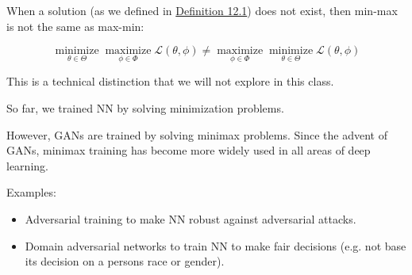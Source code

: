 \documentclass{report}
\begin{document}
\begin{concept}
    When a solution (as we defined in \hyperref[definition:12.1]{Definition 12.1}) does not exist, then min-max is not the same as max-min:

    $$
    \underset{\theta \in \Theta}{\operatorname{minimize}} \underset{\phi \in \Phi}{\operatorname{maximize}} \mathcal{L}(\theta, \phi) \neq \underset{\phi \in \Phi}{\operatorname{maximize}} \underset{\theta \in \Theta}{\operatorname{minimize}} \mathcal{L}(\theta, \phi)
    $$

    This is a technical distinction that we will not explore in this class.
\end{concept}

\begin{concept}
    So far, we trained NN by solving minimization problems.

    However, GANs are trained by solving minimax problems. Since the advent of GANs, minimax training has become more widely used in all areas of deep learning.

    Examples:

    \begin{itemize}
        \item Adversarial training to make NN robust against adversarial attacks.
        \item Domain adversarial networks to train NN to make fair decisions (e.g. not base its decision on a persons race or gender).
    \end{itemize}
\end{concept}
\end{document}
